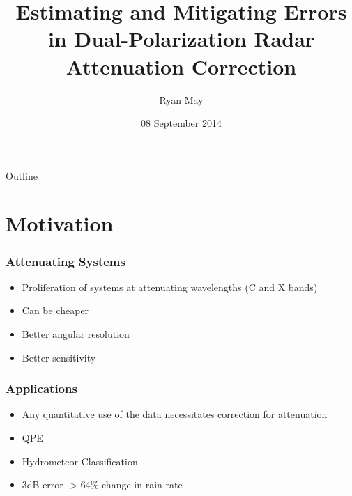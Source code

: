 \documentclass[red]{beamer}
\title{Estimating and Mitigating Errors in Dual-Polarization Radar Attenuation Correction}
\author{Ryan May}
\date{08 September 2014}
\begin{document}
\begin{frame}
	\titlepage
\end{frame}

\begin{frame}{Outline}
    \tableofcontents
\end{frame}

\section{Motivation}
\begin{frame}[<+->]
	\frametitle{Attenuating Systems}
	\begin{itemize}
		\item Proliferation of systems at attenuating wavelengths (C and X bands)
		\item Can be cheaper
		\item Better angular resolution
		\item Better sensitivity
	\end{itemize}
\end{frame}

\begin{frame}
	\frametitle{Applications}
	\begin{itemize}[<+->]
		\item Any quantitative use of the data necessitates correction for attenuation
		\item QPE
		\item Hydrometeor Classification
		\item 3dB error -> 64\% change in rain rate
	\end{itemize}
\end{frame}
\end{document}
